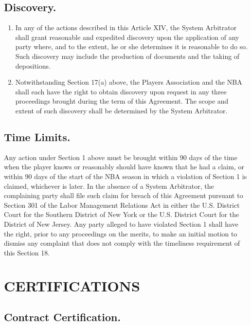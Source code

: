 \documentclass[
]{book}
\providecommand{\tightlist}{%
  \setlength{\itemsep}{0pt}\setlength{\parskip}{0pt}}
\begin{document}
\hypertarget{discovery.}{%
\section{Discovery.}\label{discovery.}}

\begin{enumerate}
\def\labelenumi{(\alph{enumi})}
\tightlist
\item
  In any of the actions described in this Article XIV, the System Arbitrator shall grant reasonable and expedited discovery upon the application of any party where, and to the extent, he or she determines it is reasonable to do so. Such discovery may include the production of documents and the taking of depositions.
\item
  Notwithstanding Section 17(a) above, the Players Association and the NBA shall each have the right to obtain discovery upon request in any three proceedings brought during the term of this Agreement. The scope and extent of such discovery shall be determined by the System Arbitrator.
\end{enumerate}

\hypertarget{time-limits.}{%
\section{Time Limits.}\label{time-limits.}}

Any action under Section 1 above must be brought within 90 days of the time when the player knows or reasonably should have known that he had a claim, or within 90 days of the start of the NBA season in which a violation of Section 1 is claimed, whichever is later. In the absence of a System Arbitrator, the complaining party shall file such claim for breach of this Agreement pursuant to Section 301 of the Labor Management Relations Act in either the U.S. District Court for the Southern District of New York or the U.S. District Court for the District of New Jersey. Any party alleged to have violated Section 1 shall have the right, prior to any proceedings on the merits, to make an initial motion to dismiss any complaint that does not comply with the timeliness requirement of this Section 18.

\hypertarget{certifications}{%
\chapter{CERTIFICATIONS}\label{certifications}}

\hypertarget{contract-certification.}{%
\section{Contract Certification.}\label{contract-certification.}}
\end{document}
